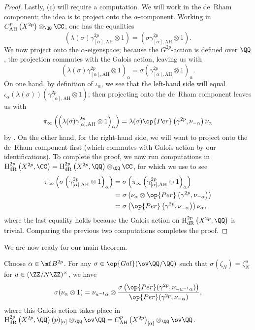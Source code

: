 \documentclass[../thesis.tex]{subfiles}
\begin{document}
\begin{proof}
	Lastly, (c) will require a computation. We will work in the de~Rham component; the idea is to project onto the $\alpha$-component. Working in $C^p_{\mathrm{AH}}\left(X^{2p}\right)\otimes_\QQ\CC$, one has the equalities
	\[\left(\lambda(\sigma)\gamma^{2p}_{[\alpha],\mathrm{AH}}\otimes1\right) = \left(\sigma\gamma^{2p}_{[\alpha],\mathrm{AH}}\otimes1\right).\]
	We now project onto the $\alpha$-eigenspace; because the $G^{2p}$-action is defined over $\QQ$, the projection commutes with the Galois action, leaving us with
	\[\left(\lambda(\sigma)\gamma^{2p}_{[\alpha],\mathrm{AH}}\otimes1\right)_\alpha = \sigma\left(\gamma^{2p}_{[\alpha],\mathrm{AH}}\otimes1\right)_\alpha.\]
	On one hand, by definition of $\iota_\alpha$, we see that the left-hand side will equal $\iota_\alpha(\lambda(\sigma))\left(\gamma^{2p}_{[\alpha],\mathrm{AH}}\otimes1\right)$; then projecting onto the de~Rham component leaves us with
	\[\pi_\infty\left(\left(\lambda(\sigma)\gamma^{2p}_{[\alpha],\mathrm{AH}}\otimes1\right)_\alpha\right)=\lambda(\sigma)\op{Per}\left(\gamma^{2p},\nu_{-\alpha}\right)\nu_\alpha\]
	by . On the other hand, for the right-hand side, we will want to project onto the de~Rham component first (which commutes with Galois action by our identifications). To complete the proof, we now run computations in $\mathrm H^{2p}_{\mathrm{dR}}\left(X^{2p},\CC\right)=\mathrm H^{2p}_{\mathrm{dR}}\left(X^{2p},\QQ\right)\otimes_\QQ\CC$, for which we use  to see
	\begin{align*}
		\pi_\infty\left(\sigma\left(\gamma^{2p}_{[\alpha],\mathrm{AH}}\otimes1\right)_\alpha\right) &= \sigma\left(\pi_\infty\left(\gamma^{2p}_{[\alpha],\mathrm{AH}}\otimes1\right)_\alpha\right) \\
		&= \sigma\left(\nu_\alpha\otimes\op{Per}\left(\gamma^{2p},\nu_{-\alpha}\right)\right) \\
		&= \sigma\left(\op{Per}\left(\gamma^{2p},\nu_{-\alpha}\right)\right)\nu_\alpha,
	\end{align*}
	where the last equality holds because the Galois action on $\mathrm H^{2p}_{\mathrm{dR}}\left(X^{2p},\QQ\right)$ is trivial. Comparing the previous two computations completes the proof.
\end{proof}
We are now ready for our main theorem.
\begin{theorem} \label{thm:fermat-galois}
	Choose $\alpha\in\mf B^{2p}$. For any $\sigma\in\op{Gal}(\ov\QQ/\QQ)$ such that $\sigma(\zeta_N)=\zeta_N^u$ for $u\in(\ZZ/N\ZZ)^\times$, we have
	\[\sigma(\nu_\alpha\otimes1)=\nu_{u^{-1}\alpha}\otimes\frac{\sigma\left(\op{Per}(\gamma^{2p},\nu_{-u^{-1}\alpha})\right)}{\op{Per}(\gamma^{2p},\nu_{-\alpha})},\]
	where this Galois action takes place in $\mathrm H^{2p}_{\mathrm{dR}}\left(X^{2p},\QQ\right)(p)_{[\alpha]}\otimes_\QQ\ov\QQ=C^p_{\mathrm{AH}}\left(X^{2p}\right)_{[\alpha]}\otimes_\QQ\ov\QQ$.
\end{theorem}
\end{document}
